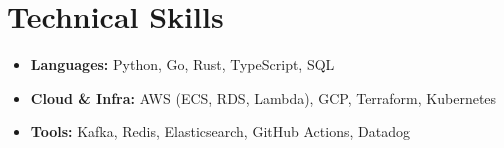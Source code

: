 \documentclass[10pt,letterpaper]{article}
\begin{document}
\section{Technical Skills}
\begin{itemize}[label={}, leftmargin=0pt]
  \item \textbf{Languages:} Python, Go, Rust, TypeScript, SQL
  \item \textbf{Cloud \& Infra:} AWS (ECS, RDS, Lambda), GCP, Terraform, Kubernetes
  \item \textbf{Tools:} Kafka, Redis, Elasticsearch, GitHub Actions, Datadog
\end{itemize}
\end{document}
